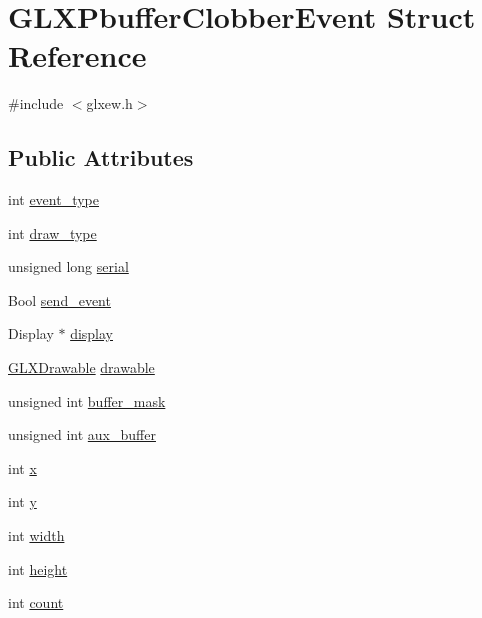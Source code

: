 \hypertarget{struct_g_l_x_pbuffer_clobber_event}{}\section{G\+L\+X\+Pbuffer\+Clobber\+Event Struct Reference}
\label{struct_g_l_x_pbuffer_clobber_event}


{\ttfamily \#include $<$glxew.\+h$>$}

\subsection*{Public Attributes}
\begin{DoxyCompactItemize}
\item 
int \hyperlink{struct_g_l_x_pbuffer_clobber_event_a30d7162d8d77246b01f5e610cda4da68}{event\+\_\+type}
\item 
int \hyperlink{struct_g_l_x_pbuffer_clobber_event_a243f92b79d3cfbde73eab02815be2320}{draw\+\_\+type}
\item 
unsigned long \hyperlink{struct_g_l_x_pbuffer_clobber_event_a6390b2875ae06a4cb827d2b4c321eda3}{serial}
\item 
Bool \hyperlink{struct_g_l_x_pbuffer_clobber_event_aa51969e67e4ad6095bda26ca64fe8ba6}{send\+\_\+event}
\item 
Display $\ast$ \hyperlink{struct_g_l_x_pbuffer_clobber_event_aeb49bb93cc59448e75d66170a39596d1}{display}
\item 
\hyperlink{glxew_8h_a826f51745d9d6c81bdbac47ae2b80cf7}{G\+L\+X\+Drawable} \hyperlink{struct_g_l_x_pbuffer_clobber_event_a388908b766e35205c1a461ea8b60439f}{drawable}
\item 
unsigned int \hyperlink{struct_g_l_x_pbuffer_clobber_event_aff4c23d00f6dad98427f8d32a5f10580}{buffer\+\_\+mask}
\item 
unsigned int \hyperlink{struct_g_l_x_pbuffer_clobber_event_a13193b6e7e3e52b15f754fe91403b7ec}{aux\+\_\+buffer}
\item 
int \hyperlink{struct_g_l_x_pbuffer_clobber_event_a8f0a7162a033c89ee94ce535580dbc32}{x}
\item 
int \hyperlink{struct_g_l_x_pbuffer_clobber_event_a69eb7ac60d36ac3ec4550ac206cfc61f}{y}
\item 
int \hyperlink{struct_g_l_x_pbuffer_clobber_event_aaca375fecb872c73c60cd5d0bfc7c7a5}{width}
\item 
int \hyperlink{struct_g_l_x_pbuffer_clobber_event_aed4e539c896bdad15217bf92c28f8520}{height}
\item 
int \hyperlink{struct_g_l_x_pbuffer_clobber_event_a61e9f6b31738464dca67f909fcacd298}{count}
\end{DoxyCompactItemize}


